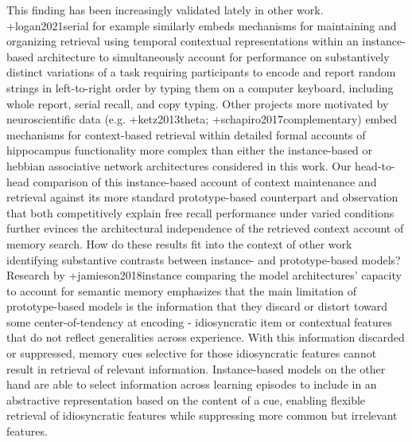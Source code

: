 {}This finding has been increasingly validated lately in other work. +{}{}{logan2021serial} for example similarly embeds mechanisms for maintaining and organizing retrieval using temporal contextual representations within an instance-based architecture to simultaneously account for performance on substantively distinct variations of a task requiring participants to encode and report random strings in left-to-right order by typing them on a computer keyboard, including whole report, serial recall, and copy typing. Other projects more motivated by neuroscientific data (e.g. +{}{}{ketz2013theta}; +{}{}{schapiro2017complementary}) embed mechanisms for context-based retrieval within detailed formal accounts of hippocampus functionality more complex than either the instance-based or hebbian associative network architectures considered in this work. Our head-to-head comparison of this instance-based account of context maintenance and retrieval against its more standard prototype-based counterpart and observation that both competitively explain free recall performance under varied conditions further evinces the architectural independence of the retrieved context account of memory search.\markdownRendererInterblockSeparator
{}How do these results fit into the context of other work identifying substantive contrasts between instance- and prototype-based models? Research by +{}{}{jamieson2018instance} comparing the model architectures' capacity to account for semantic memory emphasizes that the main limitation of prototype-based models is the information that they discard or distort toward some center-of-tendency at encoding - idiosyncratic item or contextual features that do not reflect generalities across experience. With this information discarded or suppressed, memory cues selective for those idiosyncratic features cannot result in retrieval of relevant information. Instance-based models on the other hand are able to select information across learning episodes to include in an abstractive representation based on the content of a cue, enabling flexible retrieval of idiosyncratic features while suppressing more common but irrelevant features.\markdownRendererInterblockSeparator
